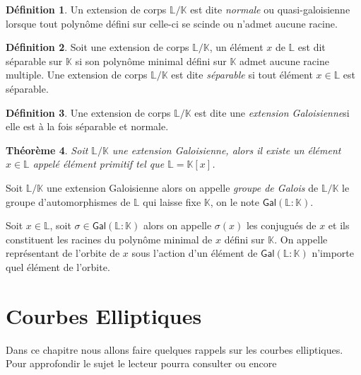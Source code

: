 \documentclass[10pt,a4paper]{book}
\theoremstyle{plain}
\newtheorem{thm}{Théorème}[chapter]
\theoremstyle{definition}
\theoremstyle{definition}
\theoremstyle{definition}
\theoremstyle{definition}
\theoremstyle{definition}
\newtheorem{defi}[thm]{Définition}
\theoremstyle{remark}
\theoremstyle{remark}
\theoremstyle{definition}
\begin{document}
\begin{defi}
Un extension de corps $\mathbb{L}/\mathbb{K}$ est dite \emph{normale} ou quasi-galoisienne lorsque tout polynôme défini sur celle-ci se scinde ou 
n'admet aucune racine.
\end{defi}

\begin{defi}
Soit une extension de corps $\mathbb{L}/\mathbb{K}$, un élément $x$ de 
$\mathbb{L}$ est dit séparable sur $\mathbb{K}$ si son polynôme minimal défini
sur $\mathbb{K}$ admet aucune racine multiple. Une extension de corps 
$\mathbb{L}/\mathbb{K}$ est dite \emph{séparable} si tout élément $x \in 
\mathbb{L}$ est séparable.
\end{defi}

\begin{defi}
Une extension de corps $\mathbb{L}/\mathbb{K}$ est dite une \emph{extension 
Galoisienne}si elle est à la fois séparable et normale.
\end{defi}

\begin{thm}
Soit $\mathbb{L}/\mathbb{K}$ une extension Galoisienne, alors il existe un 
élément $x \in \mathbb{L}$ appelé \emph{élément primitif} tel que $\mathbb{L}=\mathbb{K}[x]$. 
\end{thm}

Soit $\mathbb{L}/\mathbb{K}$ une extension Galoisienne alors on appelle 
\emph{groupe de Galois} de $\mathbb{L}/\mathbb{K}$ le groupe d'automorphismes de
 $\mathbb{L}$ qui laisse fixe $\mathbb{K}$, on le note $\mathsf{Gal}(\mathbb{L}:
 \mathbb{K})$.
 
 Soit $x \in \mathbb{L}$, soit $\sigma \in \mathsf{Gal}(\mathbb{L}:\mathbb{K})$
 alors on appelle $\sigma(x)$ les conjugués de $x$ et ils constituent les 
 racines du polynôme minimal de $x$ défini sur $\mathbb{K}$. On appelle 
 représentant de l'orbite de $x$ sous l'action d'un élément de $\mathsf{Gal}
 (\mathbb{L}:\mathbb{K})$ n'importe quel élément de l'orbite.


\section{Courbes Elliptiques}
Dans ce chapitre nous allons faire quelques rappels sur les courbes elliptiques. Pour approfondir le sujet le lecteur pourra consulter \cite{Silv1} ou encore \cite{Washington2008}
\end{document}

